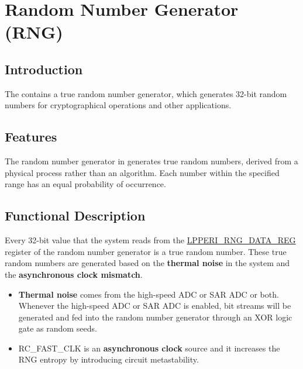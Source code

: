 \documentclass[main\_\_EN.tex]{subfiles}
\begin{document}

\ifglobal
\else
    {\let\clearpage\relax \listoftodos}
    {\let\clearpage\relax \listofdonetodos}
    \tableofcontents
\fi



\hypertarget{rng}{}
\chapter{Random Number Generator (RNG)}\label{mod:rng}

\section{Introduction}

The \chipname{} contains a true random number generator, which generates 32-bit random numbers for cryptographical operations and other applications.

\section{Features}

The random number generator in \chipname{} generates true random numbers, derived from a physical process rather than an algorithm. Each number within the specified range has an equal probability of occurrence.

\section{Functional Description}\label{sec:rng-func-descr}

Every 32-bit value that the system reads from the \hyperref[regdesc:LPPERIRNGDATAREG]{LPPERI\_RNG\_DATA\_REG} register of the random number generator is a true random number. These true random numbers are generated based on the \textbf{thermal noise} in the system and the \textbf{asynchronous clock mismatch}.

\begin{itemize}
    \item \textbf{Thermal noise} comes from the high-speed ADC or SAR ADC or both. Whenever the high-speed ADC or SAR ADC is enabled, bit streams will be generated and fed into the random number generator through an XOR logic gate as random seeds.
    \item RC\_FAST\_CLK is an \textbf{asynchronous clock} source and it increases the RNG entropy by introducing circuit metastability.
\end{itemize}
\end{document}
